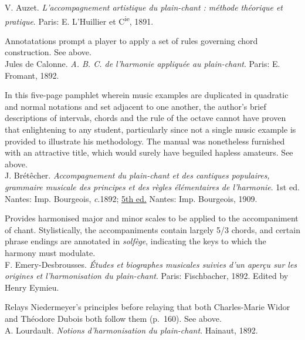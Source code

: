     \parindent=0pt
    \hangindent=0pt
  V. Auzet. \emph{L'accompagnement artistique du plain-chant : méthode théorique et pratique}. Paris:  E. L'Huillier et C\textsuperscript{ie}, 1891.

     \parindent=20pt
     \hangindent=20pt
     Annotatations prompt a player to apply a set of rules governing chord construction. See  above.\\

    \parindent=0pt
    \hangindent=0pt
  Jules de Calonne. \emph{A. B. C. de l'harmonie appliquée au plain-chant}. Paris:  E. Fromant, 1892.

     \parindent=20pt
     \hangindent=20pt
     In this five-page pamphlet wherein music examples are duplicated in quadratic and normal notations and set adjacent to one another, the author's brief descriptions of intervals, chords and the rule of the octave cannot have proven that enlightening to any student, particularly since not a single music example is provided to illustrate his methodology. The manual was nonetheless furnished with an attractive title, which would surely have beguiled hapless amateurs. See  above.\\

    \parindent=0pt
    \hangindent=0pt
  J. Brétêcher. \emph{Accompagnement du plain-chant et des cantiques populaires, grammaire musicale des principes et des règles élémentaires de l'harmonie}. 1st ed. Nantes:  Imp. Bourgeois, \emph{c}.1892;  \underline{5th ed.} Nantes:  Imp. Bourgeois, 1909.

     \parindent=20pt
     \hangindent=20pt
     Provides harmonised major and minor scales to be applied to the accompaniment of chant. Stylistically, the accompaniments contain largely 5/3 chords, and certain phrase endings are annotated in \emph{solfège}, indicating the keys to which the harmony must modulate.\\

    \parindent=0pt
    \hangindent=0pt
  F. Emery-Desbrousses. \emph{Études et biographes musicales suivies d'un aperçu sur les origines et l'harmonisation du plain-chant}. Paris:  Fischbacher, 1892. Edited by Henry Eymieu.

     \parindent=20pt
     \hangindent=20pt
     Relays Niedermeyer's principles before relaying that both Charles-Marie Widor and Théodore Dubois both follow them (p.~160). See  above.\\

    \parindent=0pt
    \hangindent=0pt
  \covid{}A. Lourdault. \emph{Notions d'harmonisation du plain-chant}. Hainaut, 1892. \\

